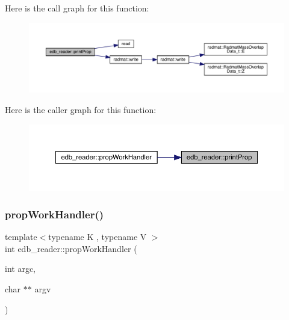 Here is the call graph for this function\+:
\nopagebreak
\begin{figure}[H]
\begin{center}
\leavevmode
\includegraphics[width=350pt]{d8/d4f/namespaceedb__reader_a35b2acb7ef05b07177eb13058c1f4768_cgraph}
\end{center}
\end{figure}
Here is the caller graph for this function\+:
\nopagebreak
\begin{figure}[H]
\begin{center}
\leavevmode
\includegraphics[width=350pt]{d8/d4f/namespaceedb__reader_a35b2acb7ef05b07177eb13058c1f4768_icgraph}
\end{center}
\end{figure}
\mbox{\label{namespaceedb__reader_ad11a22f7a22c60eef4c74fc64bb779f6}} 
\subsubsection{\texorpdfstring{propWorkHandler()}{propWorkHandler()}\hspace{0.1cm}{\footnotesize\ttfamily [1/2]}}
{\footnotesize\ttfamily template$<$typename K , typename V $>$ \\
int edb\+\_\+reader\+::prop\+Work\+Handler (\begin{DoxyParamCaption}\item[{int}]{argc,  }\item[{char $\ast$$\ast$}]{argv }\end{DoxyParamCaption})}

\mbox{\label{namespaceedb__reader_a2d373bb444230e1ed02c918c196f1d39}} 
